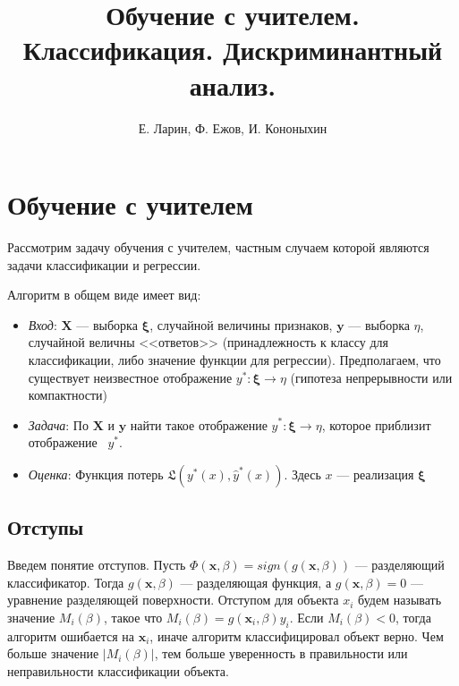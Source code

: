 \documentclass[11pt, oneside]{article}   	%
\begin{document}
	\author{Е. Ларин, Ф. Ежов, И. Кононыхин }
	\title{Обучение с учителем. Классификация. Дискриминантный анализ. }
%		
%		
	\date{}


		\maketitle 

		\section{Обучение с учителем}
		Рассмотрим задачу обучения с учителем, частным случаем которой являются задачи классификации и регрессии.

		Алгоритм в общем виде имеет вид:
		\begin{itemize}
			\item \textit{Вход}: $\bm{X}$ --- выборка $\bm{\xi}$, случайной величины признаков, $\bm{y}$ --- выборка $\eta$, случайной величны <<ответов>> (принадлежность к классу для классификации, либо значение функции для регрессии). Предполагаем, что существует неизвестное отображение $y^*: \bm{\xi} \to \eta$  (гипотеза непрерывности или компактности)
			
			\item \textit{Задача}: По $\bm{X}$ и $\bm{y}$ найти такое отображение $\hat{y}^*: \bm{\xi} \to \eta$, которое приблизит отображение  $y^*$. 
			
			\item \textit{Оценка}: Функция потерь $\mathfrak{L}(y^*(x), \hat{y}^*(x))$. Здесь $x$ --- реализация $\bm{\xi}$
		\end{itemize}
		
		\subsection{Отступы}
		\label{margins}
		Введем понятие отступов. Пусть 	$\Phi(\bm{x}, \beta) = sign  (g(\bm{x}, \beta))$ --- разделяющий классификатор. Тогда $g(\bm{x}, \beta)$ --- разделяющая функция, а $g(\bm{x}, \beta) = 0$ --- уравнение разделяющей поверхности. Отступом для объекта $x_i$ будем называть значение $M_i(\beta)$, такое что $M_i(\beta) = g(\bm{x}_i, \beta) y_i$. Если $M_i(\beta) < 0$, тогда алгоритм ошибается на $\bm{x}_i$, иначе алгоритм классифицировал объект верно. Чем больше значение $|M_i(\beta)|$, тем больше уверенность в правильности или неправильности классификации объекта.
		
\end{document}
